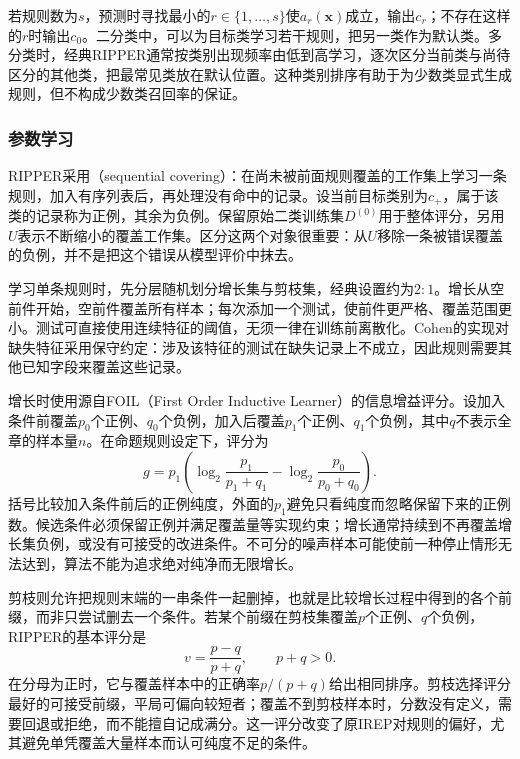 若规则数为$s$，预测时寻找最小的$r\in\{1,\ldots,s\}$使$a_r(\bm{x})$成立，输出$c_r$；不存在这样的$r$时输出$c_0$。二分类中，可以为目标类学习若干规则，把另一类作为默认类。多分类时，经典RIPPER通常按类别出现频率由低到高学习，逐次区分当前类与尚待区分的其他类，把最常见类放在默认位置。这种类别排序有助于为少数类显式生成规则，但不构成少数类召回率的保证。

\subsubsection{参数学习}
\label{sec:classification-ripper-learning}

RIPPER采用（sequential covering）：在尚未被前面规则覆盖的工作集上学习一条规则，加入有序列表后，再处理没有命中的记录。设当前目标类别为$c_+$，属于该类的记录称为正例，其余为负例。保留原始二类训练集$D^{(0)}$用于整体评分，另用$U$表示不断缩小的覆盖工作集。区分这两个对象很重要：从$U$移除一条被错误覆盖的负例，并不是把这个错误从模型评价中抹去。

学习单条规则时，先分层随机划分增长集与剪枝集，经典设置约为$2:1$。增长从空前件开始，空前件覆盖所有样本；每次添加一个测试，使前件更严格、覆盖范围更小。测试可直接使用连续特征的阈值，无须一律在训练前离散化。Cohen的实现对缺失特征采用保守约定：涉及该特征的测试在缺失记录上不成立，因此规则需要其他已知字段来覆盖这些记录。

增长时使用源自FOIL（First Order Inductive Learner）的信息增益评分。设加入条件前覆盖$p_0$个正例、$q_0$个负例，加入后覆盖$p_1$个正例、$q_1$个负例，其中$q$不表示全章的样本量$n$。在命题规则设定下，评分为
\begin{equation}
  g=p_1\left(
  \log_2\frac{p_1}{p_1+q_1}
  -\log_2\frac{p_0}{p_0+q_0}
  \right).
  \label{eq:classification-foil-gain}
\end{equation}
括号比较加入条件前后的正例纯度，外面的$p_1$避免只看纯度而忽略保留下来的正例数。候选条件必须保留正例并满足覆盖量等实现约束；增长通常持续到不再覆盖增长集负例，或没有可接受的改进条件。不可分的噪声样本可能使前一种停止情形无法达到，算法不能为追求绝对纯净而无限增长。

剪枝则允许把规则末端的一串条件一起删掉，也就是比较增长过程中得到的各个前缀，而非只尝试删去一个条件。若某个前缀在剪枝集覆盖$p$个正例、$q$个负例，RIPPER的基本评分是
\begin{equation}
  v=\frac{p-q}{p+q},\qquad p+q>0.
  \label{eq:classification-ripper-pruning}
\end{equation}
在分母为正时，它与覆盖样本中的正确率$p/(p+q)$给出相同排序。剪枝选择评分最好的可接受前缀，平局可偏向较短者；覆盖不到剪枝样本时，分数没有定义，需要回退或拒绝，而不能擅自记成满分。这一评分改变了原IREP对规则的偏好，尤其避免单凭覆盖大量样本而认可纯度不足的条件。

